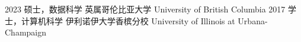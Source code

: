\begin{experiences}

\degree
{2023}
{硕士，数据科学}
{英属哥伦比亚大学 University of British Columbia}
\degree
{2017}
{学士，计算机科学}
{伊利诺伊大学香槟分校 University of Illinois at Urbana-Champaign}

\end{experiences}
